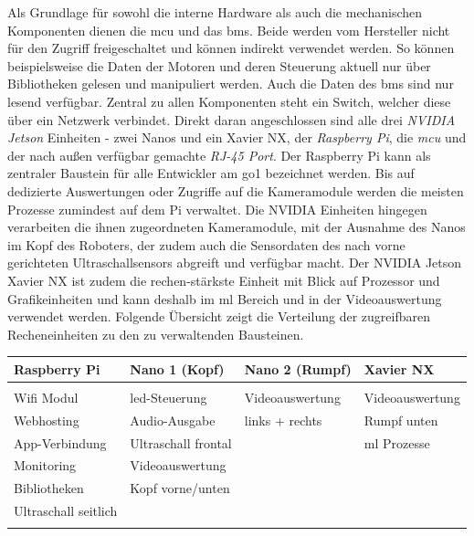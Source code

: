 Als Grundlage für sowohl die interne Hardware als auch die mechanischen Komponenten dienen die \gls{mcu} und das \gls{bms}.
Beide werden vom Hersteller nicht für den Zugriff freigeschaltet und können indirekt verwendet werden.
So können beispielsweise die Daten der Motoren und deren Steuerung aktuell nur über Bibliotheken gelesen und manipuliert werden.
Auch die Daten des \gls{bms} sind nur lesend verfügbar.
Zentral zu allen Komponenten steht ein Switch, welcher diese über ein Netzwerk verbindet.
Direkt daran angeschlossen sind alle drei \emph{NVIDIA Jetson} Einheiten - zwei Nanos und ein Xavier NX, der \emph{Raspberry Pi}, 
die \emph{\gls{mcu}} und der nach außen verfügbar gemachte \emph{RJ-45 Port}.
Der Raspberry Pi kann als zentraler Baustein für alle Entwickler am \gls{go1} bezeichnet werden.
Bis auf dedizierte Auswertungen oder Zugriffe auf die Kameramodule werden die meisten Prozesse zumindest auf dem Pi verwaltet.
Die NVIDIA Einheiten hingegen verarbeiten die ihnen zugeordneten Kameramodule, mit der Ausnahme des Nanos im Kopf des Roboters,
der zudem auch die Sensordaten des nach vorne gerichteten Ultraschallsensors abgreift und verfügbar macht.
Der NVIDIA Jetson Xavier NX ist zudem die rechen-stärkste Einheit mit Blick auf Prozessor und Grafikeinheiten und kann
deshalb im \gls{ml} Bereich und in der Videoauswertung verwendet werden.
Folgende Übersicht zeigt die Verteilung der zugreifbaren Recheneinheiten zu den zu verwaltenden Bausteinen.
\newline

\begin{table}[h]
    \centering
    \begin{tabular}{l|l|l|l}
        \textbf{Raspberry Pi} & \textbf{Nano 1 (Kopf)} & \textbf{Nano 2 (Rumpf)} & \textbf{Xavier NX} \\ \hline
        &                        &                 &                 \\
        Wifi Modul            & \gls{led}-Steuerung    & Videoauswertung & Videoauswertung \\
        Webhosting            & Audio-Ausgabe          & links + rechts  & Rumpf unten     \\
        App-Verbindung        & Ultraschall frontal    &                 & \gls{ml} Prozesse \\
        Monitoring            & Videoauswertung        &                 &                 \\
        Bibliotheken          & Kopf vorne/unten       &                 &                 \\
        Ultraschall seitlich  &                        &                 &                 \\
        &                        &                 &
    \end{tabular}
    \label{tab:ueberblick_hardware_funktionen}
\end{table}

